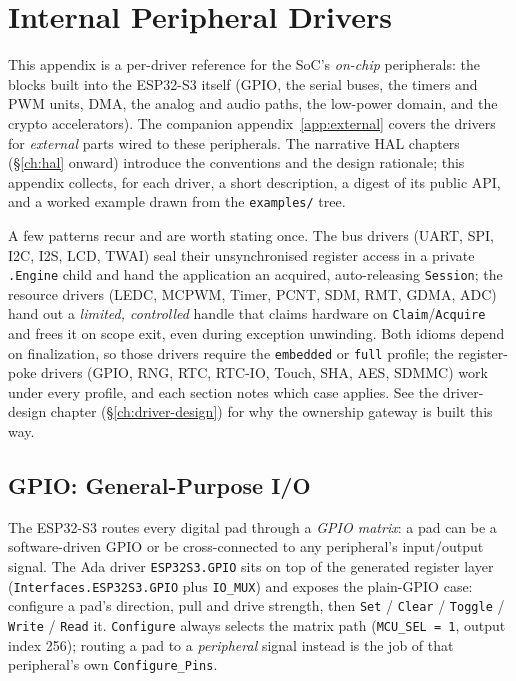 \chapter{Internal Peripheral Drivers}
\label{app:internal}

This appendix is a per-driver reference for the SoC's \emph{on-chip} peripherals:
the blocks built into the ESP32-S3 itself (GPIO, the serial buses, the
timers and PWM units, DMA, the analog and audio paths, the low-power domain, and
the crypto accelerators). The companion appendix~\ref{app:external} covers the
drivers for \emph{external} parts wired to these peripherals. The narrative HAL
chapters (\S\ref{ch:hal} onward) introduce the conventions and the design
rationale; this appendix collects, for each driver, a short description, a digest
of its public API, and a worked example drawn from the \texttt{examples/} tree.

A few patterns recur and are worth stating once. The bus drivers (UART, SPI,
I2C, I2S, LCD, TWAI) seal their unsynchronised register access in a private
\texttt{.Engine} child and hand the application an acquired, auto-releasing
\texttt{Session}; the resource drivers (LEDC, MCPWM, Timer, PCNT, SDM, RMT, GDMA,
ADC) hand out a \emph{limited, controlled} handle that claims hardware on
\texttt{Claim}/\texttt{Acquire} and frees it on scope exit, even during exception
unwinding. Both idioms depend on finalization, so those drivers require the
\texttt{embedded} or \texttt{full} profile; the register-poke drivers (GPIO,
RNG, RTC, RTC-IO, Touch, SHA, AES, SDMMC) work under every profile, and each
section notes which case applies. See the driver-design chapter
(\S\ref{ch:driver-design}) for why the ownership gateway is built this way.

\section{GPIO: General-Purpose I/O}
\label{app:int:gpio}

The ESP32-S3 routes every digital pad through a \emph{GPIO matrix}: a pad can be
a software-driven GPIO or be cross-connected to any peripheral's input/output
signal. The Ada driver \texttt{ESP32S3.GPIO} sits on top of the generated
register layer (\texttt{Interfaces.ESP32S3.GPIO} plus \texttt{IO\_MUX}) and
exposes the plain-GPIO case: configure a pad's direction, pull and drive
strength, then \texttt{Set} / \texttt{Clear} / \texttt{Toggle} / \texttt{Write}
/ \texttt{Read} it. \texttt{Configure} always selects the matrix path
(\texttt{MCU\_SEL = 1}, output index 256); routing a pad to a \emph{peripheral}
signal instead is the job of that peripheral's own \texttt{Configure\_Pins}.

